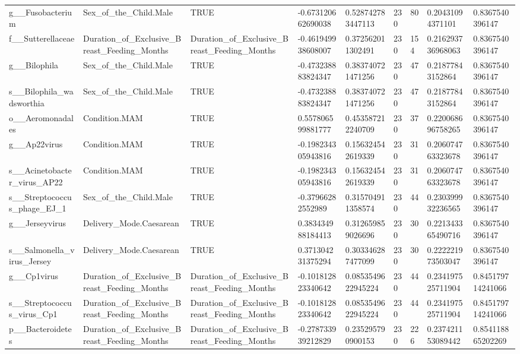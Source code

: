 \begin{longtable}{lllllllll}
g\_\_Fusobacterium & Sex\_of\_the\_Child.Male & TRUE & -0.673120662690038 & 0.528742783447113 & 230 & 80 & 0.20431094371101 & 0.8367540396147 \\
f\_\_Sutterellaceae & Duration\_of\_Exclusive\_Breast\_Feeding\_Months & Duration\_of\_Exclusive\_Breast\_Feeding\_Months & -0.461949938608007 & 0.372562011302491 & 230 & 154 & 0.216293736968063 & 0.8367540396147 \\
g\_\_Bilophila & Sex\_of\_the\_Child.Male & TRUE & -0.473238883824347 & 0.383740721471256 & 230 & 47 & 0.21877843152864 & 0.8367540396147 \\
s\_\_Bilophila\_wadsworthia & Sex\_of\_the\_Child.Male & TRUE & -0.473238883824347 & 0.383740721471256 & 230 & 47 & 0.21877843152864 & 0.8367540396147 \\
o\_\_Aeromonadales & Condition.MAM & TRUE & 0.557806599881777 & 0.453587212240709 & 230 & 37 & 0.220068696758265 & 0.8367540396147 \\
g\_\_Ap22virus & Condition.MAM & TRUE & -0.198234305943816 & 0.156324542619339 & 230 & 31 & 0.206074763323678 & 0.8367540396147 \\
s\_\_Acinetobacter\_virus\_AP22 & Condition.MAM & TRUE & -0.198234305943816 & 0.156324542619339 & 230 & 31 & 0.206074763323678 & 0.8367540396147 \\
s\_\_Streptococcus\_phage\_EJ\_1 & Sex\_of\_the\_Child.Male & TRUE & -0.37966282552989 & 0.315704911358574 & 230 & 44 & 0.230399932236565 & 0.8367540396147 \\
g\_\_Jerseyvirus & Delivery\_Mode.Caesarean & TRUE & 0.383434988184413 & 0.312659859026696 & 230 & 30 & 0.221343365490716 & 0.8367540396147 \\
s\_\_Salmonella\_virus\_Jersey & Delivery\_Mode.Caesarean & TRUE & 0.371304231375294 & 0.303346287477099 & 230 & 30 & 0.222221973503047 & 0.8367540396147 \\
g\_\_Cp1virus & Duration\_of\_Exclusive\_Breast\_Feeding\_Months & Duration\_of\_Exclusive\_Breast\_Feeding\_Months & -0.101812823340642 & 0.0853549622945224 & 230 & 44 & 0.234197525711904 & 0.845179714241066 \\
s\_\_Streptococcus\_virus\_Cp1 & Duration\_of\_Exclusive\_Breast\_Feeding\_Months & Duration\_of\_Exclusive\_Breast\_Feeding\_Months & -0.101812823340642 & 0.0853549622945224 & 230 & 44 & 0.234197525711904 & 0.845179714241066 \\
p\_\_Bacteroidetes & Duration\_of\_Exclusive\_Breast\_Feeding\_Months & Duration\_of\_Exclusive\_Breast\_Feeding\_Months & -0.278733939212829 & 0.235295790900153 & 230 & 226 & 0.237421153089442 & 0.854118865202269 \\

\end{longtable}
